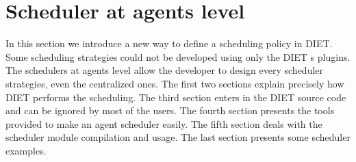 

%
\section{Scheduler at agents level}
In this section we introduce a new way to define a scheduling policy in DIET.
Some scheduling strategies could not be developed using only the DIET {\sed}s
plugins. The schedulers at agents level allow the developer to design every
scheduler strategies, even the centralized ones. The first two sections
explain precisely how DIET performs the scheduling. The third section enters
in the DIET source code and can be ignored by most of the users. The
fourth section presents the tools provided to make an agent scheduler
easily. The fifth section deals with the scheduler module compilation and
usage. The last section presents some scheduler examples.
